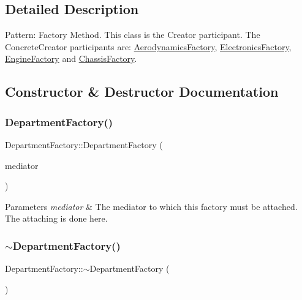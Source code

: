 \subsection{Detailed Description}
Pattern\+: Factory Method. This class is the Creator participant. The Concrete\+Creator participants are\+: \hyperlink{classAerodynamicsFactory}{Aerodynamics\+Factory}, \hyperlink{classElectronicsFactory}{Electronics\+Factory}, \hyperlink{classEngineFactory}{Engine\+Factory} and \hyperlink{classChassisFactory}{Chassis\+Factory}. 

\subsection{Constructor \& Destructor Documentation}
\mbox{\label{classDepartmentFactory_a94d9bd9fa828f2a04f3b89700007befe}} 
\subsubsection{\texorpdfstring{Department\+Factory()}{DepartmentFactory()}}
{\footnotesize\ttfamily Department\+Factory\+::\+Department\+Factory (\begin{DoxyParamCaption}\item[{\hyperlink{classDepartmentMediator}{Department\+Mediator} $\ast$}]{mediator }\end{DoxyParamCaption})}


\begin{DoxyParams}{Parameters}
{\em mediator} & The mediator to which this factory must be attached. The attaching is done here. \\
\hline
\end{DoxyParams}
\mbox{\label{classDepartmentFactory_a8792d28b10841f2f386d20dcda1c419c}} 
\subsubsection{\texorpdfstring{$\sim$\+Department\+Factory()}{~DepartmentFactory()}}
{\footnotesize\ttfamily Department\+Factory\+::$\sim$\+Department\+Factory (\begin{DoxyParamCaption}{ }\end{DoxyParamCaption})}

